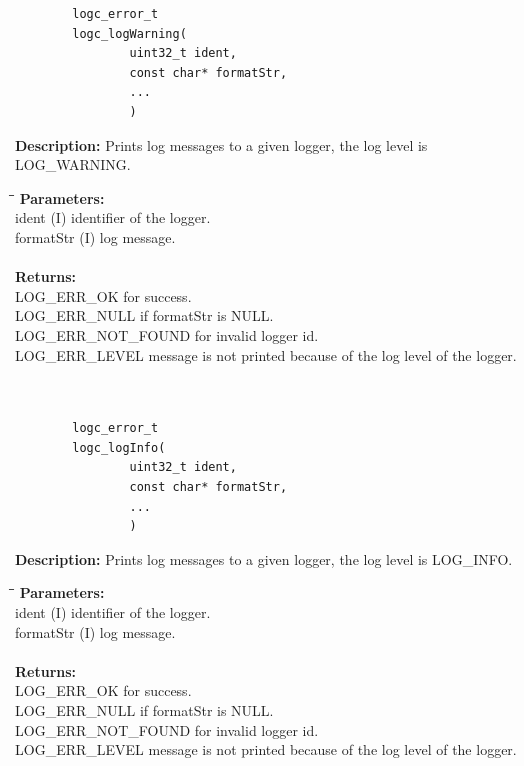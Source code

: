 \documentclass[a4paper, titlepage, 11pt]{article}
\begin{document}
\newpage

\small
\begin{verbatim}
        logc_error_t
        logc_logWarning(
                uint32_t ident,
                const char* formatStr,
                ...
                )
\end{verbatim}
\normalsize
\textbf{Description:} Prints log messages to a given logger, the log level is LOG\_WARNING.
\begin{tabbing}
\hspace*{1cm}\=\hspace*{2cm}\=\hspace*{0,6cm}\= \kill
\textbf{Parameters:} \\
\> ident \> (I) identifier of the logger. \\
\> formatStr \> (I) log message. \\ \\
\textbf{Returns:} \\
\> LOG\_ERR\_OK for success. \\
\> LOG\_ERR\_NULL if formatStr is NULL. \\
\> LOG\_ERR\_NOT\_FOUND for invalid logger id. \\
\> LOG\_ERR\_LEVEL message is not printed because of the log level of the logger. \\ \\ \\
\end{tabbing}

\small
\begin{verbatim}
        logc_error_t
        logc_logInfo(
                uint32_t ident,
                const char* formatStr,
                ...
                )
\end{verbatim}
\normalsize
\textbf{Description:} Prints log messages to a given logger, the log level is LOG\_INFO.
\begin{tabbing}
\hspace*{1cm}\=\hspace*{2cm}\=\hspace*{0,6cm}\= \kill
\textbf{Parameters:} \\
\> ident \> (I) identifier of the logger. \\
\> formatStr \> (I) log message. \\ \\
\textbf{Returns:} \\
\> LOG\_ERR\_OK for success. \\
\> LOG\_ERR\_NULL if formatStr is NULL. \\
\> LOG\_ERR\_NOT\_FOUND for invalid logger id. \\
\> LOG\_ERR\_LEVEL message is not printed because of the log level of the logger.
\end{tabbing}
\end{document}
